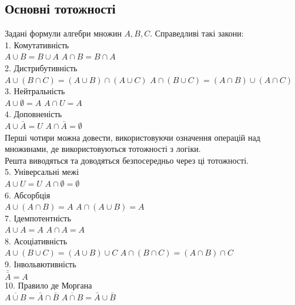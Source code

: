\documentclass[a4paper, 14pt]{extarticle}
\theoremstyle{theoremdd}
\theoremstyle{theoremdd}
\theoremstyle{theoremdd}
\theoremstyle{theoremdd}
\theoremstyle{theoremdd}
\theoremstyle{theoremdd}
\theoremstyle{theoremdd}
\theoremstyle{theoremdd}
\theoremstyle{theoremdd}
\theoremstyle{theoremdd}
\theoremstyle{theoremdd}
\theoremstyle{theoremdd}
\theoremstyle{theoremdd}
\theoremstyle{theoremdd}
\theoremstyle{theoremdd}
\begin{document}
\subsection{Основні тотожності}
Задані формули алгебри множин $A,B,C$. Справедливі такі закони:\\
1. Комутативність\\
$A \cup B = B \cup A$ \hspace{5cm} $A \cap B = B \cap A$\\
2. Дистрибутивність\\
$A \cup (B \cap C) = (A \cup B) \cap (A \cup C)$ \hspace{1cm} $A \cap (B \cup C) = (A \cap B) \cup (A \cap C)$\\
3. Нейтральність\\
$A \cup \emptyset = A$ \hspace{6cm} $A \cap U = A$\\
4. Доповненість\\
$A \cup \bar{A} = U$ \hspace{5.8cm} $A \cap \bar{A} = \emptyset$\\
Перші чотири можна довести, використовуючи означення операцій над множинами, де використовуються тотожності з логіки. \\
Решта виводяться та доводяться безпосередньо через ці тотожності.
\bigskip \\
5. Універсальні межі\\
$A \cup U = U$ \hspace{5.8cm} $A \cap \emptyset = \emptyset$\\
6. Абсорбція\\
$A \cup (A \cap B) = A$ \hspace{4.4cm} $A \cap (A \cup B) = A$\\
7. Ідемпотентність\\
$A \cup A = A$ \hspace{5.7cm} $A \cap A = A$\\
8. Асоціативність\\
$A \cup (B \cup C) = (A \cup B) \cup C$ \hspace{2cm} $A \cap (B \cap C) = (A \cap B) \cap C$\\
9. Інвольвютивність\\
$\bar{\bar{A}} = A$\\
10. Правило де Моргана\\
$\overline{A \cup B} = \bar{A} \cap \bar{B}$ \hspace{4.7cm} $\overline{A \cap B} = \bar{A} \cup \bar{B}$
\end{document}
